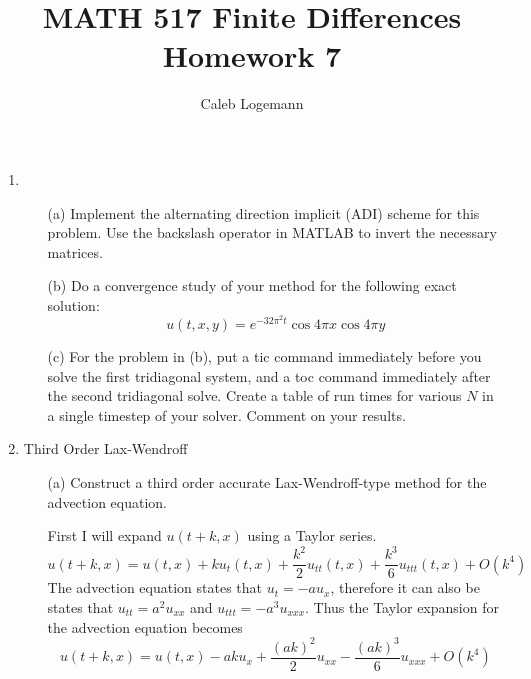 \documentclass[11pt, oneside, titlepage]{article}
\title{MATH 517 Finite Differences Homework 7}
\author{Caleb Logemann}
\begin{document}
\maketitle

%
\begin{enumerate}
    \item %
        \begin{enumerate}
            \item[(a)]
                Implement the alternating direction implicit (ADI) scheme for
                this problem.
                Use the backslash operator in MATLAB to invert the necessary
                matrices.

            \item[(b)]
                Do a convergence study of your method for the following exact
                solution:
                \[
                    u(t, x, y) = e^{-32 \pi^2 t} \cos{4 \pi x} \cos{4\pi y}
                \]

            \item[(c)]
                For the problem in (b), put a tic command immediately before you
                solve the first tridiagonal system, and a toc command
                immediately after the second tridiagonal solve.
                Create a table of run times for various $N$ in a single timestep 
                of your solver.
                Comment on your results.
        \end{enumerate}

    \item %
        Third Order Lax-Wendroff
        \begin{enumerate}
            \item[(a)]
                Construct a third order accurate Lax-Wendroff-type method for
                the advection equation.

                First I will expand $u(t + k, x)$ using a Taylor series.
                \[
                    u(t + k, x) = u(t, x) + k u_t(t, x) + \frac{k^2}{2}
                        u_{tt}(t, x) + \frac{k^3}{6} u_{ttt}(t, x) + O(k^4)
                \]
                The advection equation states that $u_t = -a u_x$, therefore it
                can also be states that $u_{tt} = a^2 u_{xx}$ and
                $u_{ttt} = -a^3 u_{xxx}$.
                Thus the Taylor expansion for the advection equation becomes
                \[
                    u(t+k,x) = u(t, x)  - ak u_x + \frac{(ak)^2}{2} u_{xx}
                        - \frac{(ak)^3}{6} u_{xxx} + O(k^4)
                \]


\end{enumerate}
\end{enumerate}
\end{document}
